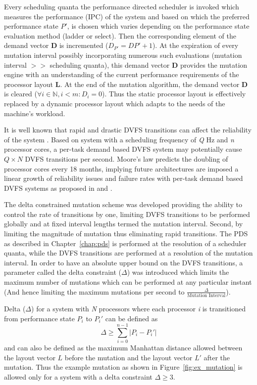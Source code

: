 Every scheduling quanta the performance directed scheduler is invoked which 
measures the performance (IPC) of the system and based on which the preferred
performance state $P'$, is chosen which varies depending 
on the performance state evaluation method (ladder or select). Then the corresponding
element of the demand vector \textbf{D} is incremented ($D_{P'} = D{P'} + 1$).
At the expiration of every mutation interval possibly incorporating numerous such
evaluations (mutation interval $>>$ scheduling quanta), this demand vector \textbf{D}
provides the mutation engine with an understanding of the current performance
requirements of the processor layout \textbf{L}. 
At the end of the mutation algorithm, the demand vector \textbf{D} is cleared
($\forall i \in \mathbb{N}, i < m: D_i = 0$). Thus the static processor layout
is effectively replaced by a dynamic processor layout which adapts to the needs
of the machine's workload.

It is well known that rapid and drastic DVFS transitions can affect the reliability 
of the system \cite{ImpactDVFS}.
Based on system with a scheduling frequency of \textit{Q} Hz
and \textit{n} processor cores, a per-task demand based DVFS system may potentially cause $Q \times N$ 
DVFS transitions per second. Moore's law predicts the doubling of processor cores every 18 months, implying
future architectures are imposed a linear growth of reliability issues and failure rates with per-task
demand based DVFS systems as proposed in \cite{LiveRuntime} and \cite{Phaseaware}. 

The delta constrained mutation scheme was developed providing the ability to control the rate of transitions
by one, limiting DVFS transitions to be performed globally and at fixed interval lengths termed the mutation
interval. Second, by limiting the magnitude of mutation thus eliminating rapid transitions.
The PDS as described in Chapter~\ref{chap:pds} is performed at the resolution of a scheduler quanta, while
the DVFS transitions are performed at a resolution of the mutation interval. In order to have an absolute
upper bound on the DVFS transitions, a parameter called the delta constraint ($\Delta$) was introduced
which limits the maximum number of mutations which can be performed at any particular instant (And hence
limiting the maximum mutations per second to $\frac{\Delta}{\text{Mutation Interval}}$). 

Delta ($\Delta$) for a system with \textit{N} processors where each processor \textit{i} is transitioned
from performance state $P_{i}$ to $P_{i}'$ can be defined as
\begin{equation}
    \Delta \geq \displaystyle\sum_{i=0}^{n-1} {| P_{i} - P_{i}' |}
\label{eq:Delta_def}
\end{equation}
and can also be defined as the maximum Manhattan distance allowed between the layout vector $L$ before the mutation and 
the layout vector $L'$ after the mutation. Thus the example mutation as shown in Figure~\ref{fig:ex_mutation}
is allowed only for a system with a delta constraint $\Delta \geq 3$. 

